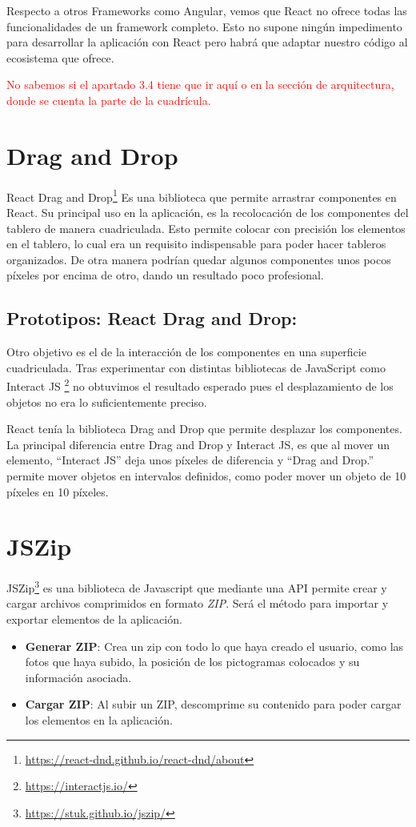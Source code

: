 Respecto a otros Frameworks como Angular, vemos que React no ofrece todas las funcionalidades de un framework completo. Esto no supone ningún impedimento para desarrollar la aplicación con React pero habrá que adaptar nuestro código al ecosistema que ofrece.


\textcolor{red}{No sabemos si el apartado 3.4 tiene que ir aquí o en la sección de arquitectura, donde se cuenta la parte de la cuadrícula.}

\section{Drag and Drop}

React Drag and Drop\footnote{\url{https://react-dnd.github.io/react-dnd/about}} Es una biblioteca que permite arrastrar componentes en React. Su principal uso en la aplicación, es la recolocación de los componentes del tablero de manera cuadriculada. Esto permite colocar con precisión los elementos en el tablero, lo cual era un requisito indispensable para poder hacer tableros organizados. De otra manera podrían quedar algunos componentes unos pocos píxeles por encima de otro, dando un resultado poco profesional.

\subsection{Prototipos: React Drag and Drop:}

Otro objetivo es el de la interacción de los componentes en una superficie cuadriculada. Tras experimentar con distintas bibliotecas de JavaScript como Interact JS \footnote{\url{https://interactjs.io/}} no obtuvimos el resultado esperado pues el desplazamiento de los objetos no era lo suficientemente preciso.

React tenía la biblioteca Drag and Drop que permite desplazar los componentes. La principal diferencia entre Drag and Drop y Interact JS, es que al mover un elemento, “Interact JS”  deja unos píxeles de diferencia y “Drag and Drop.” permite mover objetos en intervalos definidos, como poder mover un objeto de 10 píxeles en 10 píxeles.

\section{JSZip}

JSZip\footnote{\url{https://stuk.github.io/jszip/}} es una biblioteca de Javascript que mediante una API permite crear y cargar archivos comprimidos en formato \textit{ZIP}. Será el método para importar y exportar elementos de la aplicación.
\begin{itemize}
	\item \textbf{Generar ZIP}: Crea un zip con todo lo que haya creado el usuario, como las fotos que haya subido, la posición de los pictogramas colocados y su información asociada.
	\item \textbf{Cargar ZIP}: Al subir un ZIP, descomprime su contenido para poder cargar los elementos en la aplicación.
\end{itemize}	


